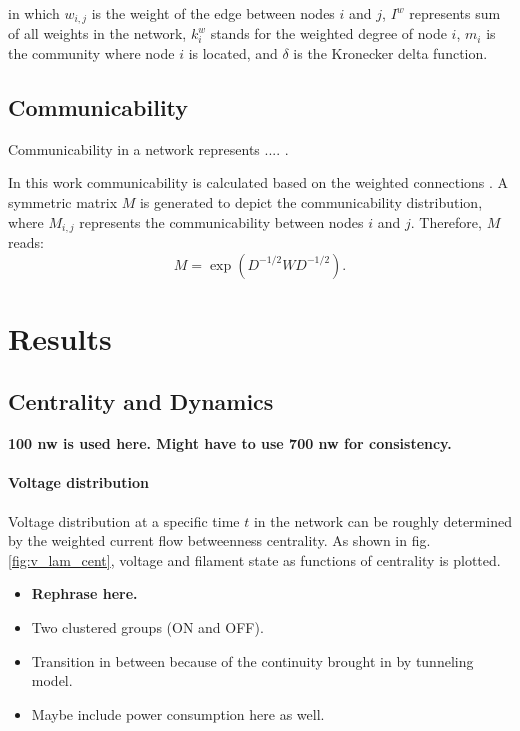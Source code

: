 \documentclass[%
 reprint,
 amsmath,amssymb,
 aps,
]{revtex4-2}
\begin{document}
in which $w_{i,j}$ is the weight of the edge between nodes $i$ and $j$, $I^w$ represents sum of all weights in the network, $k_i^w$ stands for the weighted degree of node $i$, $m_i$ is the community where node $i$ is located, and $\delta$ is the Kronecker delta function.

\subsection{\label{sec:level2} Communicability}
Communicability in a network represents .... \cite{Estrada2008}. 

In this work communicability is calculated based on the weighted connections \cite{Crofts2009}. A symmetric matrix $M$ is generated to depict the communicability distribution, where $M_{i,j}$ represents the communicability between nodes $i$ and $j$. Therefore, $M$ reads:
\begin{equation}
M = \exp{(D^{-1/2} W D^{-1/2})}.
\end{equation} 

\section{\label{sec:level1} Results }

\subsection{\label{sec:level2} Centrality and Dynamics}

\textbf{100 nw is used here. Might have to use 700 nw for consistency.}


\paragraph{Voltage distribution}

Voltage distribution at a specific time $t$ in the network can be roughly determined by the weighted current flow betweenness centrality. As shown in fig. \ref{fig:v_lam_cent}, voltage and filament state as functions of centrality is plotted. 

\begin{itemize}
\item \textbf{Rephrase here.}
\item Two clustered groups (ON and OFF). 
\item Transition in between because of the continuity brought in by tunneling model.
\item Maybe include power consumption here as well.
\end{itemize}
\end{document}
